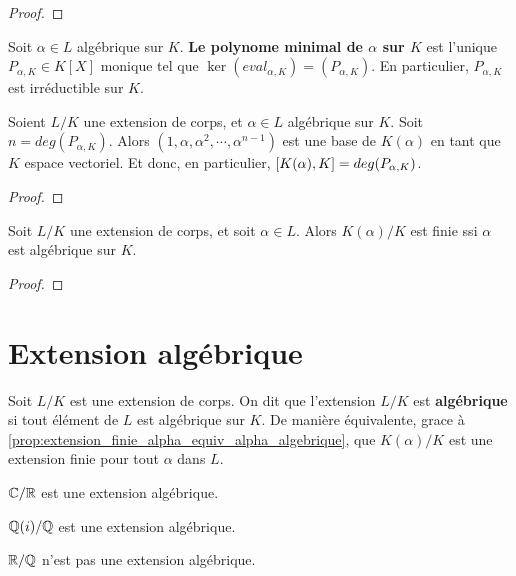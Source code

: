 \ifdefined\outputproof
\begin{proof}

\end{proof}
\fi

\begin{definition} 
	Soit $\alpha \in L$ algébrique sur $K$. \textbf{Le polynome minimal de $\alpha$ sur
	$K$} est l'unique $P_{\alpha, K} \in K[X]$ monique tel que $\ker{(eval_{\alpha,
	K})} = (P_{\alpha, K})$. En particulier, $P_{\alpha, K}$ est irréductible
	sur $K$.
\end{definition}

\begin{proposition}
	\label{prop:extension_finie_alpha_equiv_alpha_algebrique}
	Soient $L/K$ une extension de corps, et $\alpha \in L$ algébrique sur $K$.
	Soit $n = deg(P_{\alpha, K})$.
	Alors $(1, \alpha, \alpha^{2}, \cdots, \alpha^{n - 1})$ est une base de $K(\alpha)$ en tant que $K$
	espace vectoriel. Et donc, en particulier, $[K(\alpha), K] =
	deg(P_{\alpha, K})$.
\end{proposition}

\ifdefined\outputproof
\begin{proof}

\end{proof}
\fi

\begin{corollary}
	Soit $L/K$ une extension de corps, et soit $\alpha \in L$. Alors
	$K(\alpha)/K$ est finie ssi $\alpha$ est algébrique sur $K$.
\end{corollary}

\ifdefined\outputproof
\begin{proof}

\end{proof}
\fi

\section{Extension algébrique}

\begin{definition} 
	Soit $L/K$ est une extension de corps. On dit que l'extension $L/K$ est
	\textbf{algébrique} si tout élément de $L$ est algébrique sur $K$. De
	manière équivalente, grace à
	\ref{prop:extension_finie_alpha_equiv_alpha_algebrique}, que $K(\alpha)/K$
	est une extension finie pour tout $\alpha$ dans $L$.
\end{definition}

\begin{exemple}
	$\mathbb{C}/\mathbb{R}$ est une extension algébrique.

	$\mathbb{Q}(i)/\mathbb{Q}$ est une extension algébrique.

	$\mathbb{R}/\mathbb{Q}$ n'est pas une extension algébrique.
\end{exemple}

